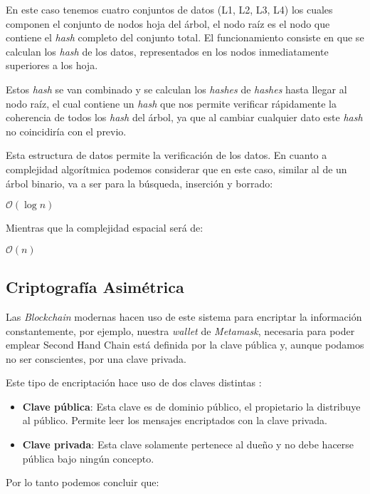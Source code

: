 En este caso tenemos cuatro conjuntos de datos (L1, L2, L3, L4) los cuales componen el conjunto de nodos hoja del árbol, el nodo raíz es el nodo que contiene el \textit{hash} completo del conjunto total.
El funcionamiento consiste en que se calculan los \textit{hash} de los datos, representados en los nodos inmediatamente superiores a los hoja.

Estos \textit{hash} se van combinado y se calculan los \textit{hashes} de \textit{hashes} hasta llegar al nodo raíz, el cual contiene un \textit{hash} que nos permite verificar rápidamente la coherencia de todos los \textit{hash} del árbol, ya que al cambiar cualquier dato este \textit{hash} no coincidiría con el previo. 

Esta estructura de datos permite la verificación de los datos. En cuanto a complejidad algorítmica podemos considerar que en este caso, similar al de un árbol binario,  va a ser para la búsqueda, inserción y borrado:

$\mathcal{O}(\log{}n)$

Mientras que la complejidad espacial será de:

$\mathcal{O}(n)$

\subsection{Criptografía Asimétrica}
Las \textit{Blockchain} modernas hacen uso de este sistema para encriptar la información constantemente, por ejemplo, nuestra \textit{wallet} de \textit{Metamask}, necesaria para poder emplear Second Hand Chain está definida por la clave pública y, aunque podamos no ser conscientes, por una clave privada.


Este tipo de encriptación hace uso de dos claves distintas \cite{enwiki:1162152127}:
\begin{itemize}
\item \textbf{Clave pública}: Esta clave es de dominio público, el propietario la distribuye al público. Permite leer los mensajes encriptados con la clave privada.
\item \textbf{Clave privada}: Esta clave solamente pertenece al dueño y no debe hacerse pública bajo ningún concepto.
\end{itemize}

Por lo tanto podemos concluir que:

